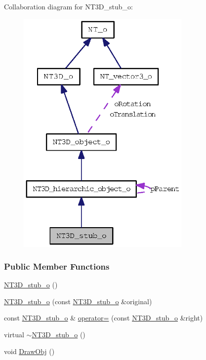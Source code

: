 Collaboration diagram for NT3D\_\-stub\_\-o:
\nopagebreak
\begin{figure}[H]
\begin{center}
\leavevmode
\includegraphics[width=239pt]{class_n_t3_d__stub__o__coll__graph}
\end{center}
\end{figure}
\subsubsection*{Public Member Functions}
\begin{DoxyCompactItemize}
\item 
\hyperlink{class_n_t3_d__stub__o_aafd268a8055bbe62bbaae50b69b24f1e}{NT3D\_\-stub\_\-o} ()
\item 
\hyperlink{class_n_t3_d__stub__o_ac957f8d6c756bf8aad6cdb196e4456d2}{NT3D\_\-stub\_\-o} (const \hyperlink{class_n_t3_d__stub__o}{NT3D\_\-stub\_\-o} \&original)
\item 
const \hyperlink{class_n_t3_d__stub__o}{NT3D\_\-stub\_\-o} \& \hyperlink{class_n_t3_d__stub__o_ae099782d39360c6a6b6083f29815ccc8}{operator=} (const \hyperlink{class_n_t3_d__stub__o}{NT3D\_\-stub\_\-o} \&right)
\item 
virtual \hyperlink{class_n_t3_d__stub__o_a64cb513fa9f2c4053368061c0e6dce7e}{$\sim$NT3D\_\-stub\_\-o} ()
\item 
void \hyperlink{class_n_t3_d__stub__o_a94d7d572875e38cea98b6fd07c335efe}{DrawObj} ()
\end{DoxyCompactItemize}


